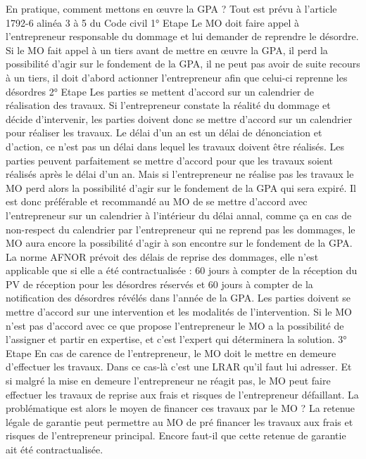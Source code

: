 				En pratique, comment mettons en œuvre la GPA ?
				Tout est prévu à l’article 1792-6 alinéa 3 à 5 du Code civil
				1° Etape
				Le MO doit faire appel à l’entrepreneur responsable du dommage et lui demander de reprendre le désordre.
				Si le MO fait appel à un tiers avant de mettre en œuvre la GPA, il perd la possibilité d’agir sur le fondement de la GPA, il ne peut pas avoir de suite recours à un tiers, il doit d’abord actionner l’entrepreneur afin que celui-ci reprenne les désordres
				2° Etape
				Les parties se mettent d’accord sur un calendrier de réalisation des travaux.
				Si l’entrepreneur constate la réalité du dommage et décide d’intervenir, les parties doivent donc se mettre d’accord sur un calendrier pour réaliser les travaux.
				Le délai d’un an est un délai de dénonciation et d’action, ce n’est pas un délai dans lequel les travaux doivent être réalisés. Les parties peuvent parfaitement se mettre d’accord pour que les travaux soient réalisés après le délai d’un an. Mais si l’entrepreneur ne réalise pas les travaux le MO perd alors la possibilité d’agir sur le fondement de la GPA qui sera expiré. Il est donc préférable et recommandé au MO de se mettre d’accord avec l’entrepreneur sur un calendrier à l’intérieur du délai annal, comme ça en cas de non-respect du calendrier par l’entrepreneur qui ne reprend pas les dommages, le MO aura encore la possibilité d’agir à son encontre sur le fondement de la GPA.
				La norme AFNOR prévoit des délais de reprise des dommages, elle n’est applicable que si elle a été contractualisée : 60 jours à compter de la réception du PV de réception pour les désordres réservés et 60 jours à compter de la notification des désordres révélés dans l’année de la GPA.
				Les parties doivent se mettre d’accord sur une intervention et les modalités de l’intervention. Si le MO n’est pas d’accord avec ce que propose l’entrepreneur le MO a la possibilité de l’assigner et partir en expertise, et c’est l’expert qui déterminera la solution.
				3° Etape
				En cas de carence de l’entrepreneur, le MO doit le mettre en demeure d’effectuer les travaux. Dans ce cas-là c’est une LRAR qu’il faut lui adresser. Et si malgré la mise en demeure l’entrepreneur ne réagit pas, le MO peut faire effectuer les travaux de reprise aux frais et risques de l’entrepreneur défaillant.
				La problématique est alors le moyen de financer ces travaux par le MO ?
				La retenue légale de garantie peut permettre au MO de pré financer les travaux aux frais et risques de l’entrepreneur principal. Encore faut-il que cette retenue de garantie ait été contractualisée.
